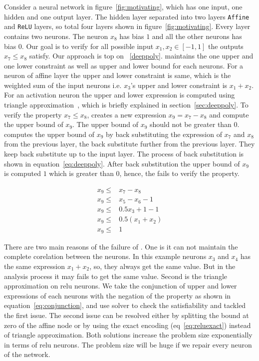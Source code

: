 Consider a neural network in figure~\ref{fig:motivating}, 
which has one input, one hidden and one output layer. The hidden layer separated into two layers 
\texttt{Affine} and \texttt{ReLU} layers, so total four layers shown in figure~\ref{fig:motivating}. 
Every layer contains two neurons. The neuron $x_8$ has bias $1$ and all the other neurons has bias $0$. 
Our goal is to verify for all possible input $x_1,x_2 \in [-1,1]$ the outputs $x_7 \leq x_8$ satisfy. 
Our approach is top on \deeppoly{}~\ref{deeppoly}. \deeppoly{} maintains the one upper and one lower constraint
as well as upper and lower bound for each neurons. For a neuron of affine layer the upper and lower constraint is 
same, which is the weighted sum of the input neurons i.e. $x_3$'s upper and lower constraint is $x_1+x_2$. 
For an activation neuron the upper and lower expression is computed using triangle approximation~\cite{deeppoly}, 
which is briefly explained in section~\ref{sec:deeppoly}. To verify the property $x_7 \leq x_8$, \deeppoly{} creates a 
new expression $x_9 = x_7 - x_8$ and compute the upper bound of $x_9$. The upper bound of $x_9$ should not be greater
than $0$. \deeppoly{} computes the upper bound of $x_9$ by back substituting the expression of $x_7$ and $x_8$ 
from the previous layer, the back substitute further from the previous layer. They keep back substitute 
up to the input layer. The process of back substitution is shown in equation~\ref{eq:deeppoly}.
After back substitution the upper bound of $x_9$ is computed $1$ which is greater than $0$, 
hence, the \deeppoly{} fails to verify the property. 


\begin{equation}
    \begin{aligned}
        x_9 \leq  &  x_7 - x_8 \\
        x_9 \leq  & x_5 - x_6 - 1 \\
        x_9 \leq  & 0.5x_3 + 1 - 1 \\
        x_9 \leq  & 0.5(x_1+x_2) \\
        x_9 \leq  & 1
    \end{aligned}
\label{eq:deeppoly}
\end{equation}

There are two main reasons of the failure of \deeppoly{}. One is it can not maintain the complete corelation 
between the neurons. In this example neurons $x_3$ and $x_4$ has the same expression $x_1+x_2$, so, they always
get the same value. But in the \deeppoly{} analysis process it may fails to get the same value. Second is the triangle
approximation on relu neurons.
We take the conjunction of upper and lower expressions of each neurons with the negation of the property
as shown in equation~\ref{eq:conjunction},
and use \milp{} solver to check the satisfiability and tackled the first issue. 
The second issue can be resolved either by splitting the 
bound at zero of the affine node or by using the exact encoding (eq~\ref{eq:reluexact}) instead of triangle approximation.
Both solutions increase the problem size exponentially in terms of relu neurons. 
The problem size will be huge if we repair every neuron of the network. 

